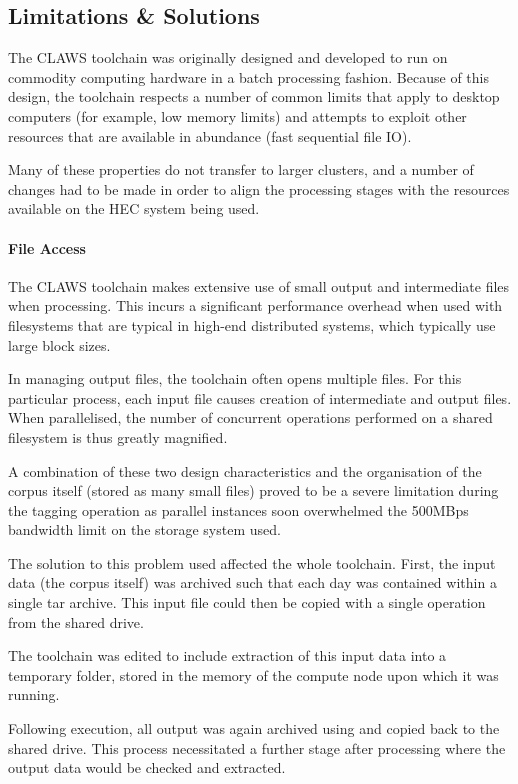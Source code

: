 \subsection{Limitations \& Solutions}
The CLAWS toolchain was originally designed and developed to run on commodity computing hardware in a batch processing fashion.  Because of this design, the toolchain respects a number of common limits that apply to desktop computers (for example, low memory limits) and attempts to exploit other resources that are available in abundance (fast sequential file IO).

Many of these properties do not transfer to larger clusters, and a number of changes had to be made in order to align the processing stages with the resources available on the HEC system being used.


\paragraph{File Access}
The CLAWS toolchain makes extensive use of small output and intermediate files when processing.  This incurs a significant performance overhead when used with filesystems that are typical in high-end distributed systems, which typically use large block sizes.

In managing output files, the toolchain often opens multiple files.  For this particular process, each input file causes creation of  intermediate and output files.  When parallelised, the number of concurrent operations performed on a shared filesystem is thus greatly magnified.

A combination of these two design characteristics and the organisation of the corpus itself (stored as many small files) proved to be a severe limitation during the tagging operation as parallel instances soon overwhelmed the 500MBps bandwidth limit on the storage system used.

The solution to this problem used affected the whole toolchain.  First, the input data (the corpus itself) was archived such that each day was contained within a single tar archive.  This input file could then be copied with a single operation from the shared drive.

The toolchain was edited to include extraction of this input data into a temporary folder, stored in the memory of the compute node upon which it was running.

Following execution, all output was again archived using  and copied back to the shared drive.  This process necessitated a further stage after processing where the output data would be checked and extracted.


